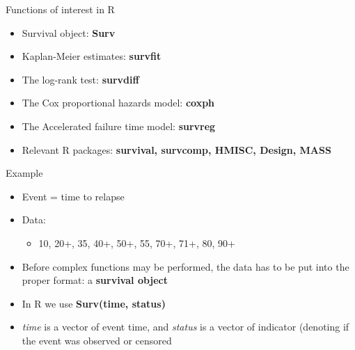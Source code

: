 \documentclass[ignorenonframetext,]{beamer}
\begin{document}
\begin{frame}{Functions of interest in R}

\begin{itemize}
\itemsep1pt\parskip0pt
\item
  Survival object: \textbf{Surv}
\item
  Kaplan-Meier estimates: \textbf{survfit}
\item
  The log-rank test: \textbf{survdiff}
\item
  The Cox proportional hazards model: \textbf{coxph}
\item
  The Accelerated failure time model: \textbf{survreg}
\item
  Relevant R packages: \textbf{survival, survcomp, HMISC, Design, MASS}
\end{itemize}

\end{frame}

\begin{frame}{Example}

\begin{itemize}
\itemsep1pt\parskip0pt
\item
  Event = time to relapse
\item
  Data:

  \begin{itemize}
  \itemsep1pt\parskip0pt
  \item
    10, 20+, 35, 40+, 50+, 55, 70+, 71+, 80, 90+
  \end{itemize}
\item
  Before complex functions may be performed, the data has to be put into
  the proper format: a \textbf{survival object}
\item
  In R we use \textbf{Surv(time, status)}
\item
  \emph{time} is a vector of event time, and \emph{status} is a vector
  of indicator (denoting if the event was observed or censored
\end{itemize}

\end{frame}
\end{document}
